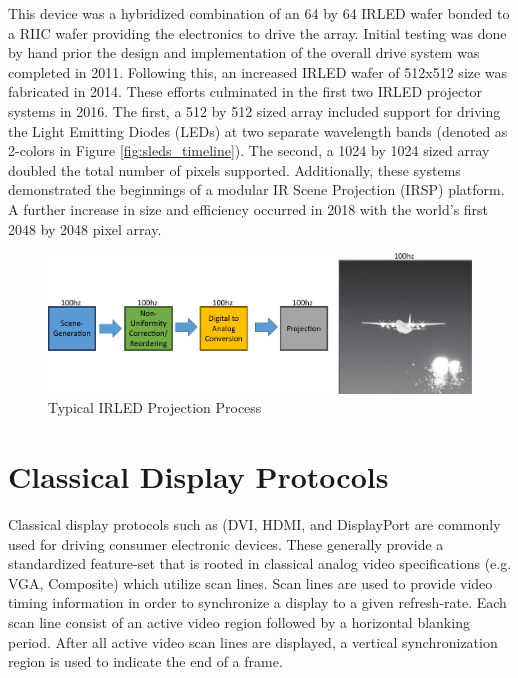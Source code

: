 This device was a hybridized combination of an 64 by 64 IRLED wafer bonded to a RIIC wafer providing the electronics to drive the array. Initial testing was done by hand prior the design and implementation of the overall drive system was completed in 2011. Following this, an increased IRLED wafer of 512x512 size was fabricated in 2014. These efforts culminated in the first two IRLED projector systems in 2016. The first, a 512 by 512 sized array included support for driving the Light Emitting Diodes (LEDs) at two separate wavelength bands (denoted as 2-colors in Figure \ref{fig:sleds_timeline})\cite{EjzakEtAl2016, RickerEtAl2017}. The second, a 1024 by 1024 sized array doubled the total number of pixels supported. Additionally, these systems demonstrated the beginnings of a modular IR Scene Projection (IRSP) platform\cite{BrowningEtAl2019}. A further increase in size and efficiency occurred in 2018 with the world's first 2048 by 2048 pixel array.

\begin{figure}
    \centering
    \includegraphics[trim=1.5in 0.5in 1.5in 1.5in,width=1.0\textwidth]{fig/typical_projection_system.pdf}
    \caption{Typical IRLED Projection Process}
    \label{fig:typical_projection}
\end{figure}





\section{Classical Display Protocols}
    \label{sec:classical_display_protocols}

    Classical display protocols such as (DVI\cite{DDWG1999}, HDMI\cite{HDMIForum2018}, and DisplayPort\cite{VESA2016} are commonly used for driving consumer electronic devices. These generally provide a standardized feature-set that is rooted in classical analog video specifications (e.g. VGA, Composite)\cite{NIAnalog} which utilize scan lines\cite{Neal1998}. Scan lines are used to provide video timing information in order to synchronize a display to a given refresh-rate. Each scan line consist of an active video region followed by a horizontal blanking period. After all active video scan lines are displayed, a vertical synchronization region is used to indicate the end of a frame.

